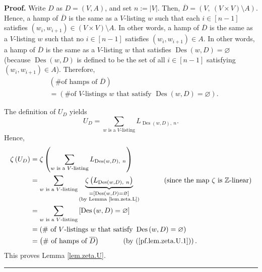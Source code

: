 \documentclass[numbers=enddot,12pt,final,onecolumn,notitlepage]{scrartcl}%
\numberwithin{exer}{section}
\theoremstyle{definition}
\newenvironment{proof}[1][Proof]{\noindent\textbf{#1.} }{\ \rule{0.5em}{0.5em}}
\let\sumnonlimits\sum
\renewcommand{\sum}{\sumnonlimits\limits}
\begin{document}
\begin{proof}
Write $D$ as $D=\left(  V,A\right)  $, and set $n:=\left\vert V\right\vert $.
Then, $\overline{D}=\left(  V,\ \left(  V\times V\right)  \setminus A\right)
$. Hence, a hamp of $\overline{D}$ is the same as a $V$-listing $w$ such that
each $i\in\left[  n-1\right]  $ satisfies $\left(  w_{i},w_{i+1}\right)
\in\left(  V\times V\right)  \setminus A$. In other words, a hamp of
$\overline{D}$ is the same as a $V$-listing $w$ such that no $i\in\left[
n-1\right]  $ satisfies $\left(  w_{i},w_{i+1}\right)  \in A$. In other words,
a hamp of $\overline{D}$ is the same as a $V$-listing $w$ that satisfies
$\operatorname*{Des}\left(  w,D\right)  =\varnothing$ (because
$\operatorname*{Des}\left(  w,D\right)  $ is defined to be the set of all
$i\in\left[  n-1\right]  $ satisfying $\left(  w_{i},w_{i+1}\right)  \in A$).
Therefore,%
\begin{align}
&  \left(  \text{\# of hamps of }\overline{D}\right) \nonumber\\
&  =\left(  \text{\# of }V\text{-listings }w\text{ that satisfy }%
\operatorname*{Des}\left(  w,D\right)  =\varnothing\right)  .
\label{pf.lem.zeta.U.1}%
\end{align}


The definition of $U_{D}$ yields%
\[
U_{D}=\sum_{w\text{ is a }V\text{-listing}}L_{\operatorname*{Des}\left(
w,D\right)  ,\ n}.
\]
Hence,%
\begin{align*}
\zeta\left(  U_{D}\right)   &  =\zeta\left(  \sum_{w\text{ is a }%
V\text{-listing}}L_{\operatorname*{Des}\left(  w,D\right)  ,\ n}\right) \\
&  =\sum_{w\text{ is a }V\text{-listing}}\underbrace{\zeta\left(
L_{\operatorname*{Des}\left(  w,D\right)  ,\ n}\right)  }_{\substack{=\left[
\operatorname*{Des}\left(  w,D\right)  =\varnothing\right]  \\\text{(by Lemma
\ref{lem.zeta.L})}}}\ \ \ \ \ \ \ \ \ \ \left(  \text{since the map }%
\zeta\text{ is }\mathbb{Z}\text{-linear}\right) \\
&  =\sum_{w\text{ is a }V\text{-listing}}\left[  \operatorname*{Des}\left(
w,D\right)  =\varnothing\right] \\
&  =\left(  \text{\# of }V\text{-listings }w\text{ that satisfy }%
\operatorname*{Des}\left(  w,D\right)  =\varnothing\right) \\
&  =\left(  \text{\# of hamps of }\overline{D}\right)
\ \ \ \ \ \ \ \ \ \ \left(  \text{by (\ref{pf.lem.zeta.U.1})}\right)  .
\end{align*}
This proves Lemma \ref{lem.zeta.U}.
\end{proof}
\end{document}
